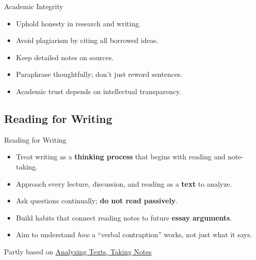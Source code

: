 \documentclass[aspectratio=169]{beamer}
\begin{document}

\begin{frame}{Academic Integrity}
\begin{itemize}
  \item Uphold honesty in research and writing.
  \item Avoid plagiarism by citing all borrowed ideas.
  \item Keep detailed notes on sources.
  \item Paraphrase thoughtfully; don’t just reword sentences.
  \item Academic trust depends on intellectual transparency.
\end{itemize}
\end{frame}



\subsection{Reading for Writing}
\begin{frame}{Reading for Writing}
\begin{itemize}
  \item Treat writing as a \textbf{thinking process} that begins with reading and note-taking.
  \item Approach every lecture, discussion, and reading as a \textbf{text} to analyze.
  \item Ask questions continually; \textbf{do not read passively}.
  \item Build habits that connect reading notes to future \textbf{essay arguments}.
  \item Aim to understand \emph{how} a “verbal contraption” works, not just what it says.
  \end{itemize}

\vfill
Partly based on \href{https://mlpp.pressbooks.pub/writinghandbook/chapter/chapter-1/}{Analyzing Texts, Taking Notes} \citep[Ch.~1]{writinghandbook}

  
\end{frame}
\end{document}
